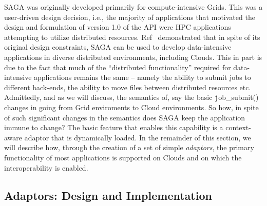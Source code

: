 \documentclass[conference,final]{IEEEtran}
\begin{document}
SAGA was originally developed primarily for compute-intensive
Grids. This was a user-driven design decision, i.e., the majority of
applications that motivated the design and formulation of version 1.0
of the API were HPC applications attempting to utilize distributed
resources.  Ref~\cite{saga_ccgrid09} demonstrated that in spite of its
original design constraints, SAGA can be used to develop
data-intensive applications in diverse distributed environments,
including Clouds.  This in part is due to the fact that much of the
``distributed functionality'' required for data-intensive applications
remains the same -- namely the ability to submit jobs to different
back-ends, the ability to move files between distributed resources
etc. Admittedly, and as we will discuss, the semantics of, say the
basic {\texttt job\_submit()} changes in going from Grid enviroments
to Cloud environments.
So how, in spite of such significant changes in the semantics does
SAGA keep the application immune to change? The basic feature that
enables this capability is a context-aware adaptor that is dynamically
loaded.  In the remainder of this section, we will describe how,
through the creation of a set of simple {\it adaptors}, the primary
functionality of most applications is supported on Clouds and on which
the interoperability is enabled.


\subsection{Adaptors: Design and Implementation}


 
\end{document}
